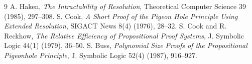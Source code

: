 \documentclass[11pt]{article}
\begin{document}
\begin{thebibliography}{9}
 A. Haken, \emph{The Intractability of Resolution}, Theoretical Computer Science 39 (1985), 297--308.
 S. Cook, \emph{A Short Proof of the Pigeon Hole Principle Using Extended Resolution}, SIGACT News 8(4) (1976), 28--32.
 S. Cook and R. Reckhow, \emph{The Relative Efficiency of Propositional Proof Systems}, J. Symbolic Logic 44(1) (1979), 36--50.
 S. Buss, \emph{Polynomial Size Proofs of the Propositional Pigeonhole Principle}, J. Symbolic Logic 52(4) (1987), 916--927.
\end{thebibliography}
\end{document}
